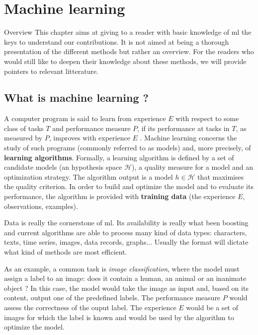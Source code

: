 \chapter{Machine learning}
\label{chap:backml}

\begin{overview}{Overview}
This chapter aims at giving to a reader with basic knowledge of \acrshort{ml} the keys to understand our contributions. It is not aimed at being a thorough presentation of the different methods but rather an overview. For the readers who would still like to deepen their knowledge about these methods, we will provide pointers to relevant litterature.
\end{overview}

\section{What is machine learning ?} 
\label{sec:backml:whatisml}

A computer program is said to learn from experience $E$ with respect to some class of tasks $T$ and performance measure $P$, if its performance at tasks in $T$, as measured by $P$, improves with experience $E$ \parencite{mitchell1997machine}. Machine learning concerns the study of such programs (commonly referred to as models) and, more precisely, of \textbf{learning algorithms}. Formally, a learning algorithm is defined by a set of candidate models (\ie an hypothesis space $\mathcal{H}$), a quality measure for a model and an optimization strategy. The algorithm output is a model $h \in \mathcal{H}$ that maximises the quality criterion. In order to build and optimize the model and to evaluate its performance, the algorithm is provided with \textbf{training data} (the experience $E$, \aka observations, examples). 

Data is really the cornerstone of \acrlong{ml}. Its availability is really what been boosting  and current algorithms are able to process many kind of data types: characters, texts, time series, images, data records, graphs... Usually the format will dictate what kind of methods are most efficient. 


As an example, a common task is \textit{image classification}, where the model must assign a label to an image: does it contain a human, an animal or an inanimate object ? In this case, the model would take the image as input and, based on its content, output one of the predefined labels. The performance measure $P$ would assess the correctness of the ouput label. The experience $E$ would be a set of images for which the label is known and would be used by the algorithm to optimize the model.

